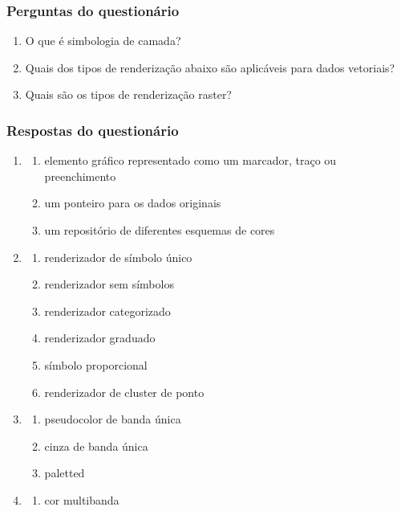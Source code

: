 \documentclass[
  portuguese,
]{krantz}
\providecommand{\tightlist}{%
  \setlength{\itemsep}{0pt}\setlength{\parskip}{0pt}}
\begin{document}
\hypertarget{perguntas-do-questionuxe1rio-8}{%
\subsubsection{\texorpdfstring{\textbf{Perguntas do questionário}}{Perguntas do questionário}}\label{perguntas-do-questionuxe1rio-8}}

\begin{enumerate}
\def\labelenumi{\arabic{enumi}.}
\tightlist
\item
  O que é simbologia de camada?
\item
  Quais dos tipos de renderização abaixo são aplicáveis para dados vetoriais?
\item
  Quais são os tipos de renderização raster?
\end{enumerate}

\hypertarget{respostas-do-questionuxe1rio}{%
\subsubsection{\texorpdfstring{\textbf{Respostas do questionário}}{Respostas do questionário}}\label{respostas-do-questionuxe1rio}}

\begin{enumerate}
\def\labelenumi{\arabic{enumi}.}
\item
  \begin{enumerate}
  \def\labelenumii{\alph{enumii}.}
  \tightlist
  \item
    elemento gráfico representado como um marcador, traço ou preenchimento
  \item
    um ponteiro para os dados originais
  \item
    um repositório de diferentes esquemas de cores
  \end{enumerate}
\item
  \begin{enumerate}
  \def\labelenumii{\alph{enumii}.}
  \tightlist
  \item
    renderizador de símbolo único
  \item
    renderizador sem símbolos
  \item
    renderizador categorizado
  \item
    renderizador graduado
  \item
    símbolo proporcional
  \item
    renderizador de cluster de ponto
  \end{enumerate}
\item
  \begin{enumerate}
  \def\labelenumii{\alph{enumii}.}
  \tightlist
  \item
    pseudocolor de banda única
  \item
    cinza de banda única
  \item
    paletted
  \end{enumerate}
\item
  \begin{enumerate}
  \def\labelenumii{\alph{enumii}.}
  \setcounter{enumii}{3}
  \tightlist
  \item
    cor multibanda
  \end{enumerate}
\end{enumerate}
\end{document}
